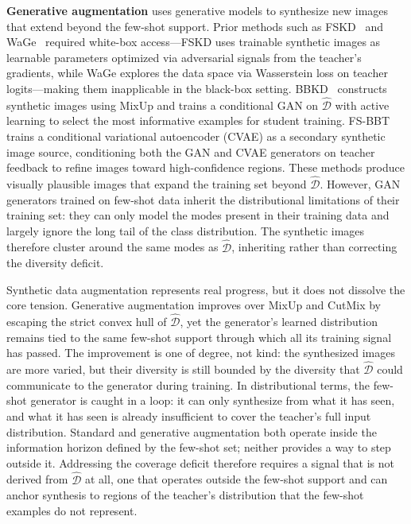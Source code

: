 \begin{foldable}
  \textbf{Generative augmentation} uses generative models to synthesize new images that extend beyond the few-shot support.
  Prior methods such as FSKD~\cite{kimura2018few} and WaGe~\cite{kong2020learning} required white-box access---FSKD uses trainable synthetic images as learnable parameters optimized via adversarial signals from the teacher's gradients, while WaGe explores the data space via Wasserstein loss on teacher logits---making them inapplicable in the black-box setting.
  BBKD~\cite{wang2020neural} constructs synthetic images using MixUp and trains a conditional GAN on $\hat{\mathcal{D}}$ with active learning to select the most informative examples for student training.
  FS-BBT~\cite{nguyen2022black} trains a conditional variational autoencoder (CVAE) as a secondary synthetic image source, conditioning both the GAN and CVAE generators on teacher feedback to refine images toward high-confidence regions.
  These methods produce visually plausible images that expand the training set beyond $\hat{\mathcal{D}}$.
  However, GAN generators trained on few-shot data inherit the distributional limitations of their training set: they can only model the modes present in their training data and largely ignore the long tail of the class distribution.
  The synthetic images therefore cluster around the same modes as $\hat{\mathcal{D}}$, inheriting rather than correcting the diversity deficit.
\end{foldable}

\begin{foldable}
  Synthetic data augmentation represents real progress, but it does not dissolve the core tension.
  Generative augmentation improves over MixUp and CutMix by escaping the strict convex hull of $\hat{\mathcal{D}}$, yet the generator's learned distribution remains tied to the same few-shot support through which all its training signal has passed.
  The improvement is one of degree, not kind: the synthesized images are more varied, but their diversity is still bounded by the diversity that $\hat{\mathcal{D}}$ could communicate to the generator during training.
  In distributional terms, the few-shot generator is caught in a loop: it can only synthesize from what it has seen, and what it has seen is already insufficient to cover the teacher's full input distribution.
  Standard and generative augmentation both operate inside the information horizon defined by the few-shot set; neither provides a way to step outside it.
  Addressing the coverage deficit therefore requires a signal that is not derived from $\hat{\mathcal{D}}$ at all, one that operates outside the few-shot support and can anchor synthesis to regions of the teacher's distribution that the few-shot examples do not represent.
\end{foldable}

